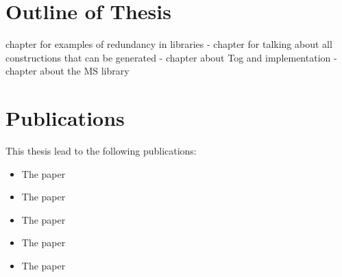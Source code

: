 
\section{Outline of Thesis}
chapter for examples of redundancy in libraries - 
chapter for talking about all constructions that can be generated - 
chapter about Tog and implementation - 
chapter about the MS library  

\section{Publications}
This thesis lead to the following publications: 
\begin{itemize}
    \item The paper \cite{biformCICM2018}
    \item The paper \cite{diagrams_mmt}
    \item The paper \cite{leverageCICM2020}
    \item The paper \cite{carette2018building}
    \item The paper \cite{bercic2020space}
\end{itemize}


